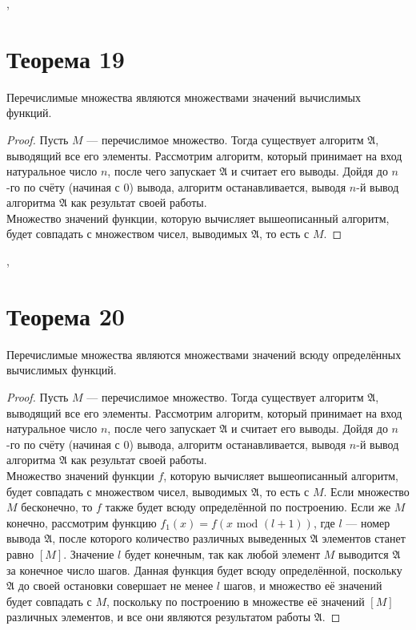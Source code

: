 \documentclass[a4paper,12pt]{article}
\begin{document}
    \sep
    
    \section {Теорема 19}
    \begin{theorem}
    Перечислимые множества являются множествами значений вычислимых функций.
    \end{theorem}
    \begin{proof} Пусть $M$ --- перечислимое множество. Тогда существует алгоритм $\mathfrak{A}$, выводящий все его элементы. Рассмотрим алгоритм, который принимает на вход натуральное число $n$, после чего запускает $\mathfrak{A}$ и считает его выводы. Дойдя до $n$-го по счёту (начиная с 0) вывода, алгоритм останавливается, выводя $n$-й вывод алгоритма $\mathfrak{A}$ как результат своей работы.\\
    Множество значений функции, которую вычисляет вышеописанный алгоритм, будет совпадать с множеством чисел, выводимых $\mathfrak{A}$, то есть с $M$.
    
    \end{proof}
    
    \sep
    
    \section {Теорема 20}
    \begin{theorem}
    Перечислимые множества являются множествами значений всюду определённых вычислимых функций.
    \end{theorem}
    \begin{proof} Пусть $M$ --- перечислимое множество. Тогда существует алгоритм $\mathfrak{A}$, выводящий все его элементы. Рассмотрим алгоритм, который принимает на вход натуральное число $n$, после чего запускает $\mathfrak{A}$ и считает его выводы. Дойдя до $n$-го по счёту (начиная с 0) вывода, алгоритм останавливается, выводя $n$-й вывод алгоритма $\mathfrak{A}$ как результат своей работы.\\
    Множество значений функции $f$, которую вычисляет вышеописанный алгоритм, будет совпадать с множеством чисел, выводимых $\mathfrak{A}$, то есть с $M$. Если множество $M$ бесконечно, то $f$ также будет всюду определённой по построению. Если же $M$ конечно, рассмотрим функцию $f_1(x)=f(x \text{ mod } (l + 1))$, где $l$ --- номер вывода $\mathfrak{A}$, после которого количество различных выведенных $\mathfrak{A}$ элементов станет равно $[M]$. Значение $l$ будет конечным, так как любой элемент $M$ выводится $\mathfrak{A}$ за конечное число шагов. Данная функция будет всюду определённой, поскольку $\mathfrak{A}$ до своей остановки совершает не менее $l$ шагов, и множество её значений будет совпадать с $M$, поскольку по построению в множестве её значений $[M]$ различных элементов, и все они являются результатом работы $\mathfrak{A}$.
    
    \end{proof}
    
\end{document}

